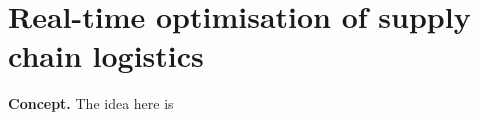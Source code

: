 \chapter{\sffamily Real-time optimisation of supply chain logistics}

{\bfseries\sffamily Concept.} The idea here is 

